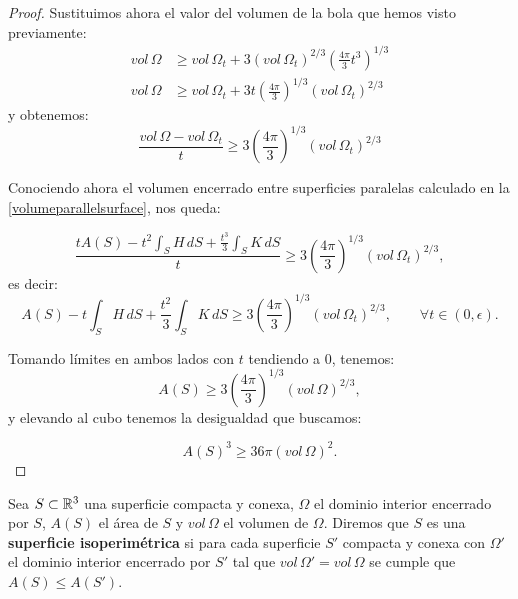 \begin{proof}
Sustituimos ahora el valor del volumen de la bola que hemos visto previamente:
%
\begin{align*}
    vol \, \Omega &\geq vol \, \Omega_t + 3(vol \, \Omega_t)^{2/3} \left( \frac{4\pi}{3}t^3 \right)^{1/3} \\
    vol \, \Omega &\geq vol \, \Omega_t + 3t \left( \frac{4\pi}{3} \right)^{1/3} (vol \, \Omega_t)^{2/3}
\end{align*}
%
y obtenemos:
%
\begin{equation*}
    \frac{vol \, \Omega - vol \, \Omega_t}{t} \geq 3 \left( \frac{4\pi}{3} \right)^{1/3} (vol \, \Omega_t)^{2/3}
\end{equation*}

Conociendo ahora el volumen encerrado entre superficies paralelas calculado en la \autoref{volumeparallelsurface}, nos queda:

\begin{equation*}
    \frac{tA(S) - t^2\int_S H \, dS + \frac{t^3}{3}\int_S K \, dS}{t} \geq 3 \left( \frac{4\pi}{3} \right)^{1/3} (vol \, \Omega_t)^{2/3},
\end{equation*}
%
es decir:
%
\begin{equation*}
    A(S) - t\int_S H \, dS + \frac{t^2}{3}\int_S K \, dS \geq 3 \left( \frac{4\pi}{3} \right)^{1/3} (vol \, \Omega_t)^{2/3}, \qquad \forall t \in (0,\epsilon).
\end{equation*}

Tomando límites en ambos lados con $t$ tendiendo a $0$, tenemos:
%
\begin{equation*}
    A(S) \geq 3 \left( \frac{4\pi}{3} \right)^{1/3} (vol \, \Omega)^{2/3},
\end{equation*}
%
y elevando al cubo tenemos la desigualdad que buscamos:

\begin{equation*}
    A(S)^3 \geq 36\pi(vol \, \Omega)^2.
\end{equation*}
\end{proof}

\begin{definition}
Sea $S \subset \mathbb{R}^3$ una superficie compacta y conexa, $\Omega$ el dominio interior encerrado por $S$, $A(S)$ el área de $S$ y $vol \, \Omega$ el volumen de $\Omega$. Diremos que $S$ es una \textbf{superficie isoperimétrica} si para cada superficie $S'$ compacta y conexa con $\Omega'$ el dominio interior encerrado por $S'$ tal que $vol \, \Omega' = vol \, \Omega$ se cumple que $A(S) \leq A(S')$.
\end{definition}

